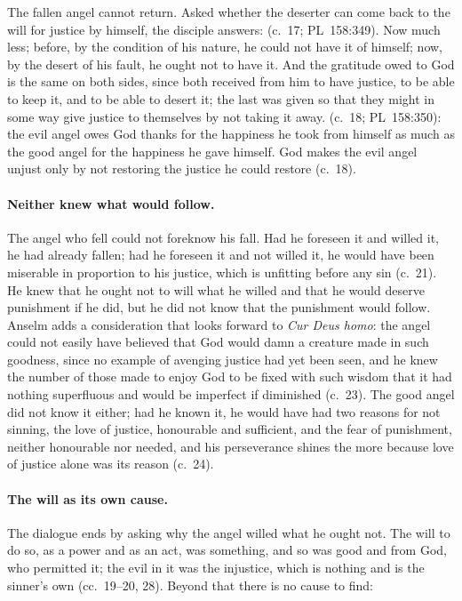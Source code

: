 The fallen angel cannot return. Asked whether the deserter can come back to
the will for justice by himself, the disciple answers:  (c.~17; PL~158:349). Now much less; before,
by the condition of his nature, he could not have it of himself; now, by the
desert of his fault, he ought not to have it. And the gratitude owed to God
is the same on both sides, since both received from him to have justice, to
be able to keep it, and to be able to desert it; the last was given so that
they might in some way give justice to themselves by not taking it away.
 (c.~18;
PL~158:350): the evil angel owes God thanks for the happiness he took from
himself as much as the good angel for the happiness he gave himself. God
makes the evil angel unjust only by not restoring the justice he could
restore (c.~18).

\paragraph{Neither knew what would follow.} The angel who fell could not
foreknow his fall. Had he foreseen it and willed it, he had already fallen;
had he foreseen it and not willed it, he would have been miserable in
proportion to his justice, which is unfitting before any sin (c.~21). He
knew that he ought not to will what he willed and that he would deserve
punishment if he did, but he did not know that the punishment would follow.
Anselm adds a consideration that looks forward to \emph{Cur Deus homo}: the
angel could not easily have believed that God would damn a creature made in
such goodness, since no example of avenging justice had yet been seen, and he
knew the number of those made to enjoy God to be fixed with such wisdom that
it had nothing superfluous and would be imperfect if diminished (c.~23). The
good angel did not know it either; had he known it, he would have had two
reasons for not sinning, the love of justice, honourable and sufficient, and
the fear of punishment, neither honourable nor needed, and his perseverance
shines the more because love of justice alone was its reason (c.~24).

\paragraph{The will as its own cause.} The dialogue ends by asking why the
angel willed what he ought not. The will to do so, as a power and as an act,
was something, and so was good and from God, who permitted it; the evil in
it was the injustice, which is nothing and is the sinner's own (cc.~19--20,
28). Beyond that there is no cause to find:

